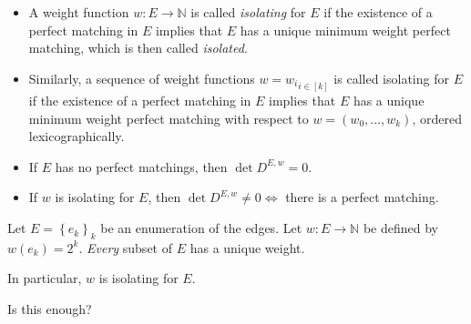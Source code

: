 \documentclass{beamer}
\theoremstyle{remark}
\newcommand{\nn}{\mathbb{N}}
\begin{document}
\begin{frame}[allowframebreaks]
  \begin{definitions}
    \begin{itemize}
      \item A weight function $w : E \to \nn$ is called \emph{isolating} for
      $E$ if the existence of a perfect matching in $E$
      implies that $E$ has a unique minimum weight perfect matching,
      which is then called \emph{isolated}.

      \item Similarly, a sequence of weight functions $w = {w_i}_{i \in [k]}$
      is called isolating for $E$ if the existence of a perfect matching
      in $E$ implies that $E$ has a unique minimum weight perfect matching
      with respect to $w = (w_0, \ldots, w_k)$, ordered lexicographically.
    \end{itemize}
  \end{definitions}

  \begin{corollary}
    \begin{itemize}
      \item If $E$ has no perfect matchings, then
            $\det D^{E,w} = 0$.
      \item If $w$ is isolating for $E$,
            then $\det D^{E,w} \ne 0 \iff $ there is a perfect matching.
    \end{itemize}
  \end{corollary}
\end{frame}

\begin{frame}
  \begin{example}
    Let $E = \left\{e_k\right\}_k$ be an enumeration of the edges.
    Let $w : E \to \nn$ be defined by
    $w(e_k) = 2^k$. \emph{Every} subset of $E$ has a unique
    weight.

    In particular, $w$ is isolating for $E$.

    Is this enough?
  \end{example}
\end{frame}
\end{document}

